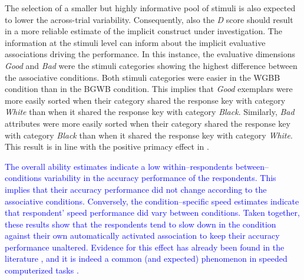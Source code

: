 \documentclass[12pt]{book}
\begin{document}
The selection of a smaller but highly informative pool of stimuli is also expected to lower the across-trial variability. Consequently, also the \emph{D} score should result in a more reliable estimate of the implicit construct under investigation.
The information at the stimuli level can inform about the implicit evaluative associations driving the performance.
In this instance, the evaluative dimensions \emph{Good} and \emph{Bad} were the stimuli categories showing the highest difference between the associative conditions. Both stimuli categories were easier in the WGBB condition than in the BGWB condition. This implies that  \emph{Good} exemplars were more easily sorted when their category shared the response key with category \emph{White}  than when it shared the response key with category \emph{Black}. 
Similarly, \emph{Bad} attributes were more easily sorted when their category shared the response key
with category \emph{Black} than when it shared the response key with category \emph{White}. 
This result is in line with the positive primacy effect in . 

\textcolor{blue}{The overall ability estimates indicate a low within--respondents between--conditions variability in the accuracy performance of the respondents. This implies that their accuracy performance did not change according to the associative conditions. 
	Conversely, the condition--specific speed estimates indicate that respondent' speed performance did vary between conditions. 
	Taken together, these results show that the respondents tend to slow down in the condition against their own automatically activated association to keep their accuracy performance unaltered. 
	Evidence for this effect has already been found in the literature \cite<speed-accuracy trade-off,>{Klauer2007}, and it is indeed a common (and expected) phenomenon in speeded computerized tasks \cite{van2006, VanDerLinden2009}.
}
\end{document}
